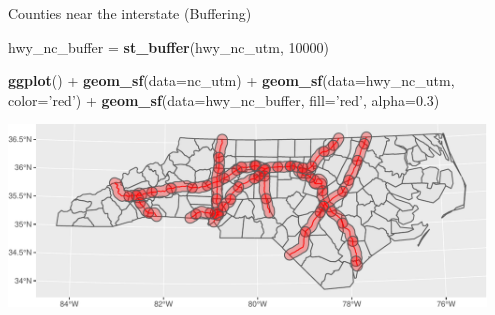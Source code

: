 \documentclass[11pt,ignorenonframetext,]{beamer}
\newenvironment{Shaded}{}{}
\newcommand{\KeywordTok}[1]{\textcolor[rgb]{0.00,0.44,0.13}{\textbf{#1}}}
\newcommand{\DataTypeTok}[1]{\textcolor[rgb]{0.56,0.13,0.00}{#1}}
\newcommand{\DecValTok}[1]{\textcolor[rgb]{0.25,0.63,0.44}{#1}}
\newcommand{\FloatTok}[1]{\textcolor[rgb]{0.25,0.63,0.44}{#1}}
\newcommand{\StringTok}[1]{\textcolor[rgb]{0.25,0.44,0.63}{#1}}
\newcommand{\OperatorTok}[1]{\textcolor[rgb]{0.40,0.40,0.40}{#1}}
\newcommand{\NormalTok}[1]{#1}
\let\oldShaded\Shaded
\let\endoldShaded\endShaded
\renewenvironment{Shaded}{\footnotesize\begin{spacing}{0.9}\oldShaded}{\endoldShaded\end{spacing}}
\let\oldverbatim\verbatim
\let\endoldverbatim\endverbatim
\newcommand{\scriptoutput}{
  \renewenvironment{Shaded}{\scriptsize\begin{spacing}{0.9}\oldShaded}{\endoldShaded\end{spacing}}
  \renewenvironment{verbatim}{\scriptsize\begin{spacing}{0.9}\oldverbatim}{\endoldverbatim\end{spacing}}
}
\begin{document}
\begin{frame}[fragile,t]{Counties near the interstate (Buffering)}

\scriptoutput

\begin{Shaded}
\begin{Highlighting}[]
\NormalTok{hwy_nc_buffer =}\StringTok{ }\KeywordTok{st_buffer}\NormalTok{(hwy_nc_utm, }\DecValTok{10000}\NormalTok{)}

\KeywordTok{ggplot}\NormalTok{() }\OperatorTok{+}\StringTok{ }
\StringTok{  }\KeywordTok{geom_sf}\NormalTok{(}\DataTypeTok{data=}\NormalTok{nc_utm) }\OperatorTok{+}
\StringTok{  }\KeywordTok{geom_sf}\NormalTok{(}\DataTypeTok{data=}\NormalTok{hwy_nc_utm, }\DataTypeTok{color=}\StringTok{'red'}\NormalTok{) }\OperatorTok{+}
\StringTok{  }\KeywordTok{geom_sf}\NormalTok{(}\DataTypeTok{data=}\NormalTok{hwy_nc_buffer, }\DataTypeTok{fill=}\StringTok{'red'}\NormalTok{, }\DataTypeTok{alpha=}\FloatTok{0.3}\NormalTok{)}
\end{Highlighting}
\end{Shaded}

\begin{center}\includegraphics[width=0.95\textwidth]{Lec17_files/figure-beamer/unnamed-chunk-29-1} \end{center}

\end{frame}
\end{document}
